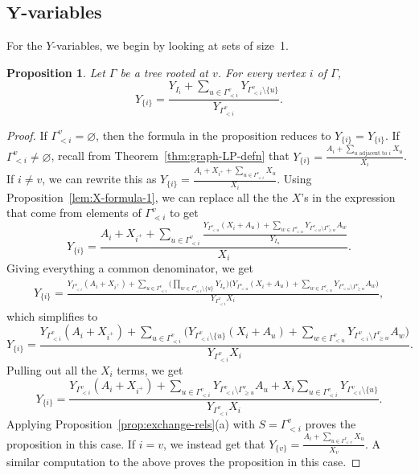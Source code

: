 \documentclass[pdftex]{sigma}
\numberwithin{equation}{section}
\newtheorem{Proposition}[Theorem]{Proposition}
 { \theoremstyle{definition}
\newtheorem{Definition}[Theorem]{Definition}
\newtheorem{Note}[Theorem]{Note}
\newtheorem{Example}[Theorem]{Example}
\newtheorem{Remark}[Theorem]{Remark} }
\newcommand{\new}[1]{{#1}}
\begin{document}
\subsection[Y-variables]{$\boldsymbol{Y}$-variables}\label{sec:Y-formulas}
For the $Y$-variables, we begin by looking at sets of size~1.
\begin{Proposition}\label{prop:Y-single-formula}
Let $\Gamma$ be a tree rooted at $v$. For every vertex $i$ of $\Gamma$,
\[ Y_{\{i\}}=\frac{Y_{I_i}+\sum_{u\in\Gamma_{\lessdot i}^v}Y_{\Gamma_{< i}^v\setminus\{u\}}}{Y_{\Gamma_{< i}^v}}.\]
\end{Proposition}
\begin{proof}
If $\Gamma_{< i}^v=\varnothing$, then the formula in the proposition reduces to $Y_{\{i\}}=Y_{\{i\}}$.
If $\Gamma_{< i}^v\neq\varnothing$, recall from Theorem~\ref{thm:graph-LP-defn} that $Y_{\{i\}}=\frac{A_i+\sum_{u\text{ adjacent to }i}X_u}{X_i}$. If $i\neq v$, we can rewrite this as $Y_{\{i\}}=\frac{A_i+X_{i^+}+\sum_{u\in\Gamma_{\lessdot i}^v}X_u}{X_i}$. Using Proposition~\ref{lem:X-formula-1}, we can replace all the the $X$'s in the expression that come from elements of $\Gamma_{\lessdot i}^v$ to get
\[ Y_{\{i\}}=\frac{A_i+X_{i^+}+\sum_{u\in\Gamma_{\lessdot i}^v}\frac{Y_{\Gamma_{< u}^v}(X_i+A_u)+\sum_{w\in \Gamma_{< u}^v}Y_{\Gamma_{< u}^v\setminus\Gamma_{\geq w}^v}A_w}{Y_{I_u}}}{X_i}.\]
Giving everything a common denominator, we get
\begin{gather*}
 Y_{\{i\}}=\frac{Y_{\Gamma_{< i}^v}(A_i+X_{i^+})+\sum\limits_{u\in\Gamma_{\lessdot i}^v}\Big(\prod\limits_{w\in\Gamma_{\lessdot i}^v\setminus\{u\}}Y_{I_w}\Big)\Big(Y_{\Gamma_{< u}^v}(X_i+A_u)+\sum\limits_{w\in \Gamma_{< u}^v}Y_{\Gamma_{< u}^v\setminus\Gamma_{\geq w}^v}A_w\Big)}{Y_{\Gamma_{< i}^v}X_i},
 \end{gather*}
which simplifies to
\[ Y_{\{i\}}=\frac{Y_{\Gamma_{< i}^v}(A_i+X_{i^+})+\sum_{u\in\Gamma_{\lessdot i}^v}\Big(Y_{\Gamma_{< i}^v\setminus\{u\}}(X_i+A_u)+\sum_{w\in \Gamma_{< u}^v}Y_{\Gamma_{< i}^v\setminus\Gamma_{\geq w}^v}A_w\Big)}{Y_{\Gamma_{< i}^v}X_i}.\]
Pulling out all the $X_i$ terms, we get
\[ Y_{\{i\}}=\frac{Y_{\Gamma_{< i}^v}(A_i+X_{i^+})+\sum_{u\in\Gamma_{< i}^v}Y_{\Gamma_{< i}^v\setminus\Gamma_{\geq u}^v}A_u+X_i\sum_{u\in\Gamma_{\lessdot i}^v}Y_{\Gamma_{< i}^v\setminus\{u\}}}{Y_{\Gamma_{< i}^v}X_i}.\]
Applying Proposition~\ref{prop:exchange-rels}(a) with $S=\Gamma_{< i}^v$ proves the \new{proposition} in this case.
If $i=v$, we instead get that $Y_{\{v\}}=\frac{A_i+\sum_{u\in\Gamma_{\lessdot v}^v}X_u}{X_v}$. A similar computation to the above proves the \new{proposition} in this case.
\end{proof}
\end{document}
